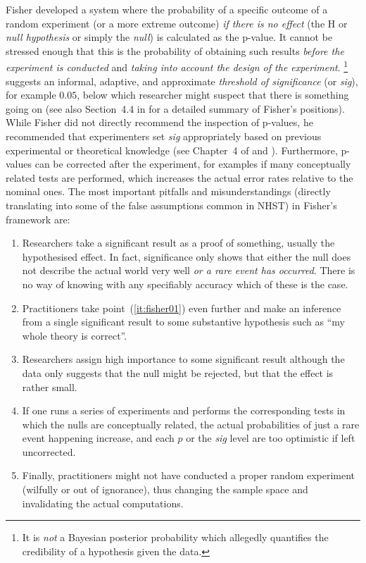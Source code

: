 Fisher developed a system where the probability of a specific outcome of a random experiment (or a more extreme outcome) \textit{if there is no effect} (the H or \textit{null hypothesis} or simply the \textit{null}) is calculated as the p-value.
It cannot be stressed enough that this is the probability of obtaining such results \textit{before the experiment is conducted} and \textit{taking into account the design of the experiment}.%
\footnote{It is \textit{not} a Bayesian posterior probability which allegedly quantifies the credibility of a hypothesis given the data.}
\textcite[504]{Fisher1926} suggests an informal, adaptive, and approximate \textit{threshold of significance} (or \textit{sig}), for example $0.05$, below which researcher might suspect that there is something going on (see also Section~4.4 in \citealt{Lehmann2011} for a detailed summary of Fisher's positions).
While Fisher did not directly recommend the inspection of p-values, he recommended that experimenters set \textit{sig} appropriately based on previous experimental or theoretical knowledge (see Chapter~4 of \citealt{Lehmann2011} and \citealt{Perezgonzalez2015}).
Furthermore, p-values can be corrected after the experiment, for examples if many conceptually related tests are performed, which increases the actual error rates relative to the nominal ones.
The most important pitfalls and misunderstandings (directly translating into some of the false assumptions common in NHST) in Fisher's framework are:

\vspace{\baselineskip}
\begin{enumerate}
\item \label{it:fisher01} Researchers take a significant result as a proof of something, usually the hypothesised effect.
In fact, significance only shows that either the null does not describe the actual world very well \textit{or a rare event has occurred}.
There is no way of knowing with any specifiably accuracy which of these is the case.
\item \label{it:fisher02} Practitioners take point~(\ref{it:fisher01}) even further and make an inference from a single significant result to some substantive hypothesis such as ``my whole theory is correct''.
\item \label{it:fisher03} Researchers assign high importance to some significant result although the data only suggests that the null might be rejected, but that the effect is rather small.
\item \label{it:fisher04} If one runs a series of experiments and performs the corresponding tests in which the nulls are conceptually related, the actual probabilities of just a rare event happening increase, and each $p$ or the \textit{sig} level are too optimistic if left uncorrected.
\item \label{it:fisher05} Finally, practitioners might not have conducted a proper random experiment (wilfully or out of ignorance), thus changing the sample space and invalidating the actual computations.
\end{enumerate}
\vspace{\baselineskip}

